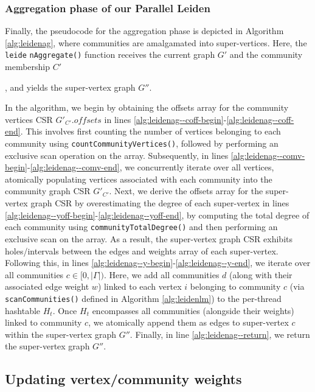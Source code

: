\subsubsection{Aggregation phase of our Parallel Leiden}

Finally, the pseudocode for the aggregation phase is depicted in Algorithm \ref{alg:leidenag}, where communities are amalgamated into super-vertices. Here, the \texttt{leide} \texttt{nAggregate()} function receives the current graph $G'$ and the community membership $C'$, and yields the super-vertex graph $G''$.



In the algorithm, we begin by obtaining the offsets array for the community vertices CSR $G'_{C'}.offsets$ in lines \ref{alg:leidenag--coff-begin}-\ref{alg:leidenag--coff-end}. This involves first counting the number of vertices belonging to each community using \texttt{countCommunityVertices()}, followed by performing an exclusive scan operation on the array. Subsequently, in lines \ref{alg:leidenag--comv-begin}-\ref{alg:leidenag--comv-end}, we concurrently iterate over all vertices, atomically populating vertices associated with each community into the community graph CSR $G'_{C'}$. Next, we derive the offsets array for the super-vertex graph CSR by overestimating the degree of each super-vertex in lines \ref{alg:leidenag--yoff-begin}-\ref{alg:leidenag--yoff-end}, by computing the total degree of each community using \texttt{communityTotalDegree()} and then performing an exclusive scan on the array. As a result, the super-vertex graph CSR exhibits holes/intervals between the edges and weights array of each super-vertex. Following this, in lines \ref{alg:leidenag--y-begin}-\ref{alg:leidenag--y-end}, we iterate over all communities $c \in [0, |\Gamma|)$. Here, we add all communities $d$ (along with their associated edge weight $w$) linked to each vertex $i$ belonging to community $c$ (via \texttt{scanCommunities()} defined in Algorithm \ref{alg:leidenlm}) to the per-thread hashtable $H_t$. Once $H_t$ encompasses all communities (alongside their weights) linked to community $c$, we atomically append them as edges to super-vertex $c$ within the super-vertex graph $G''$. Finally, in line \ref{alg:leidenag--return}, we return the super-vertex graph $G''$.


\subsection{Updating vertex/community weights}
\label{sec:our-update}

